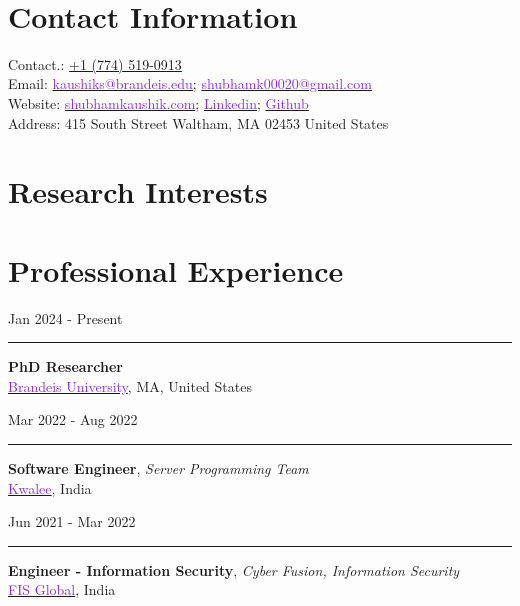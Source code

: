 \documentclass[10pt,a4paper,calibri]{moderncv}
\newcommand{\mediumspace}{\vspace{0.6em}}
\newcommand{\workexperience}[2]{
  \noindent
  \begin{minipage}[c]{0.20\textwidth}
    \begin{flushright}
      #1
    \end{flushright}
  \end{minipage}%
  \hspace{0.01\textwidth}
  \begin{minipage}[c]{0.02\textwidth}
    \textcolor{lightgray}{\rule{1pt}{0.7cm}}
  \end{minipage}%
  \begin{minipage}[c]{0.80\textwidth}
    \raggedright{
      #2
    }
  \end{minipage}%
}
\begin{document}
\makecvtitle\

\vspace{-50pt}
\section{Contact Information}
Contact.: \href{tel:+17745190913}{+1 (774) 519-0913}\\ Email:
\href{mailto:kaushiks@brandeis.edu}{\textcolor{blueviolet}{kaushiks@brandeis.edu}}\;;
\href{mailto:shubhamk00020@gmail.com}{\textcolor{blueviolet}{shubhamk00020@gmail.com}}\\
Website:
\href{https://www.shubhamkaushik.com}{\textcolor{blueviolet}{shubhamkaushik.com}}\;;
\href{https://www.linkedin.com/in/shubham-sudo}{\textcolor{blueviolet}{Linkedin}}\;;
\href{https://www.github.com/shubham-sudo}{\textcolor{blueviolet}{Github}}\\
Address: 415 South Street Waltham, MA 02453 United States

\section{Research Interests}


\section{Professional Experience}
\workexperience{Jan 2024 \-- Present}{
	\textbf{PhD Researcher}\\
	\href{https://www.brandeis.edu/}{\textcolor{blueviolet}{Brandeis University}}, MA, United States\\
}

\mediumspace

\workexperience{Mar 2022 \-- Aug 2022}{
	\textbf{Software Engineer}, \textit{Server Programming Team}\\
	\href{https://www.kwalee.com/}{\textcolor{blueviolet}{Kwalee}}, India\\
}

\mediumspace

\workexperience{Jun 2021 \-- Mar 2022}{
	\textbf{Engineer \-- Information Security}, \textit{Cyber Fusion, Information Security}\\
	\href{https://www.fisglobal.com/en}{\textcolor{blueviolet}{FIS Global}}, India\\
}

\mediumspace
\end{document}
